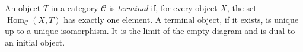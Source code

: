 
An object $T$ in a category $\mathcal C$ is \emph{terminal} if, for every object $X$, the set $\operatorname{Hom}_{\mathcal C}(X,T)$ has exactly one element. A terminal object, if it exists, is unique up to a unique isomorphism. It is the limit of the empty diagram and is dual to an initial object.
